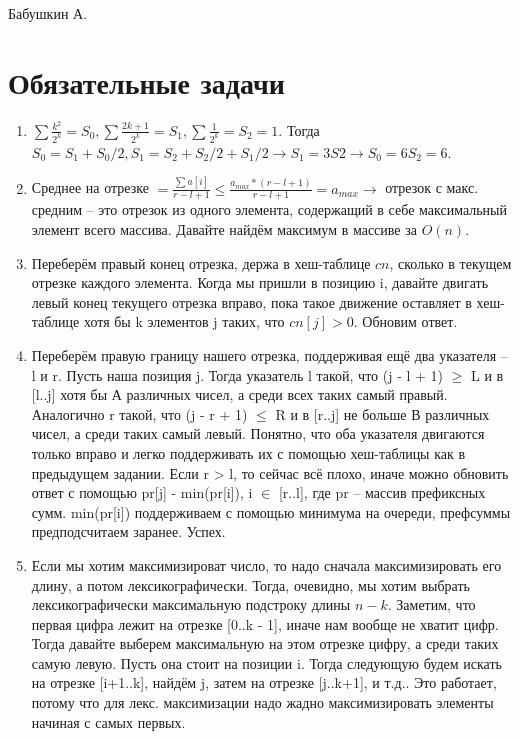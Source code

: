 \documentclass[12pt]{article}
\begin{document}
Бабушкин А.

\section{Обязательные задачи}

\begin{enumerate}
	\setlength{\parskip}{0pt} 
	\setlength{\itemsep}{0pt} 
	\item $\sum\frac{k^2}{2^k} = S_0, \sum\frac{2k+1}{2^k} = S_1, \sum\frac{1}{2^k} = S_2 = 1$. Тогда $S_0 = S_1 + S_0/2, S_1 = S_2 + S_2/2 + S_1/2 \to S_1 = 3S2 \to S_0 = 6S_2 = 6$. \\
	\item Среднее на отрезке $ = \frac{\sum a[i]}{r - l + 1} \le \frac{a_{max} * (r - l + 1)}{r - l + 1} = a_{max} \to$ отрезок с макс. средним -- это отрезок из одного элемента, содержащий в себе максимальный элемент всего массива. Давайте найдём максимум в массиве за $O(n)$. \\
	\item Переберём правый конец отрезка, держа в хеш-таблице $cn$, сколько в текущем отрезке каждого элемента. Когда мы пришли в позицию i, давайте двигать левый конец текущего отрезка вправо, пока такое движение оставляет в хеш-таблице хотя бы k элементов j таких, что $cn[j] > 0$. Обновим ответ. \\
	\item Переберём правую границу нашего отрезка, поддерживая ещё два указателя -- l и r. Пусть наша позиция j. Тогда указатель l такой, что (j - l + 1) $\ge$ L и в [l..j] хотя бы А различных чисел, а среди всех таких самый правый. Аналогично r такой, что (j - r + 1) $\le$ R и в [r..j] не больше В различных чисел, а среди таких самый левый. Понятно, что оба указателя двигаются только вправо и легко поддерживать их с помощью хеш-таблицы как в предыдущем задании. Если r > l, то сейчас всё плохо, иначе можно обновить ответ с помощью pr[j] - min(pr[i]), i $\in$ [r..l], где pr -- массив префиксных сумм. min(pr[i]) поддерживаем с помощью минимума на очереди, префсуммы предподсчитаем заранее. Успех. \\
	\item Если мы хотим максимизироват число, то надо сначала максимизировать его длину, а потом лексикографически. Тогда, очевидно, мы хотим выбрать лексикографически максимальную подстроку длины $n-k$. Заметим, что первая цифра лежит на отрезке [0..k - 1], иначе нам вообще не хватит цифр. Тогда давайте выберем максимальную на этом отрезке цифру, а среди таких самую левую. Пусть она стоит на позиции i. Тогда следующую будем искать на отрезке [i+1..k], найдём j, затем на отрезке [j..k+1], и т.д.. Это работает, потому что для лекс. максимизации надо жадно максимизировать элементы начиная с самых первых. \\

\end{enumerate}
\end{document}
